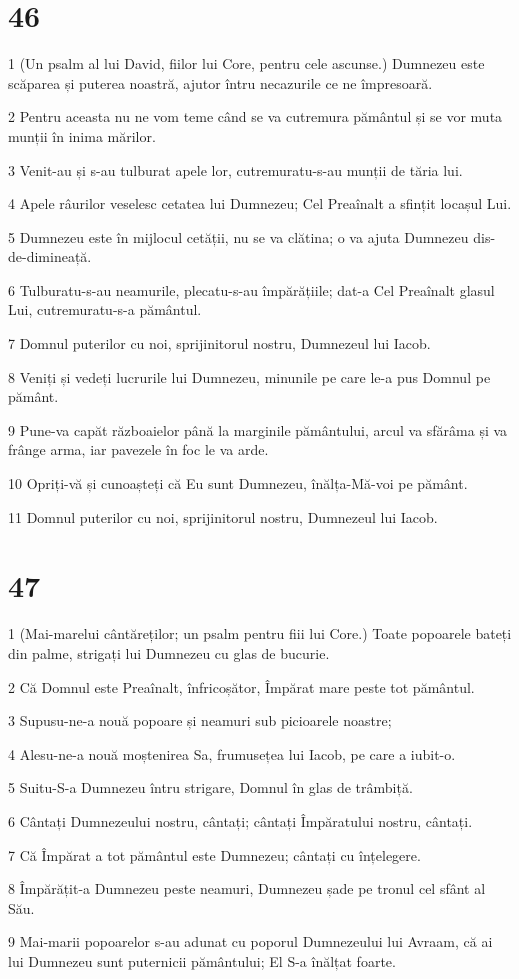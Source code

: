\chapter{46}

\par 1 (Un psalm al lui David, fiilor lui Core, pentru cele ascunse.) Dumnezeu este scăparea și puterea noastră, ajutor întru necazurile ce ne împresoară.
\par 2 Pentru aceasta nu ne vom teme când se va cutremura pământul și se vor muta munții în inima mărilor.
\par 3 Venit-au și s-au tulburat apele lor, cutremuratu-s-au munții de tăria lui.
\par 4 Apele râurilor veselesc cetatea lui Dumnezeu; Cel Preaînalt a sfințit locașul Lui.
\par 5 Dumnezeu este în mijlocul cetății, nu se va clătina; o va ajuta Dumnezeu dis-de-dimineață.
\par 6 Tulburatu-s-au neamurile, plecatu-s-au împărățiile; dat-a Cel Preaînalt glasul Lui, cutremuratu-s-a pământul.
\par 7 Domnul puterilor cu noi, sprijinitorul nostru, Dumnezeul lui Iacob.
\par 8 Veniți și vedeți lucrurile lui Dumnezeu, minunile pe care le-a pus Domnul pe pământ.
\par 9 Pune-va capăt războaielor până la marginile pământului, arcul va sfărâma și va frânge arma, iar pavezele în foc le va arde.
\par 10 Opriți-vă și cunoașteți că Eu sunt Dumnezeu, înălța-Mă-voi pe pământ.
\par 11 Domnul puterilor cu noi, sprijinitorul nostru, Dumnezeul lui Iacob.

\chapter{47}

\par 1 (Mai-marelui cântăreților; un psalm pentru fiii lui Core.) Toate popoarele bateți din palme, strigați lui Dumnezeu cu glas de bucurie.
\par 2 Că Domnul este Preaînalt, înfricoșător, Împărat mare peste tot pământul.
\par 3 Supusu-ne-a nouă popoare și neamuri sub picioarele noastre;
\par 4 Alesu-ne-a nouă moștenirea Sa, frumusețea lui Iacob, pe care a iubit-o.
\par 5 Suitu-S-a Dumnezeu întru strigare, Domnul în glas de trâmbiță.
\par 6 Cântați Dumnezeului nostru, cântați; cântați Împăratului nostru, cântați.
\par 7 Că Împărat a tot pământul este Dumnezeu; cântați cu înțelegere.
\par 8 Împărățit-a Dumnezeu peste neamuri, Dumnezeu șade pe tronul cel sfânt al Său.
\par 9 Mai-marii popoarelor s-au adunat cu poporul Dumnezeului lui Avraam, că ai lui Dumnezeu sunt puternicii pământului; El S-a înălțat foarte.

